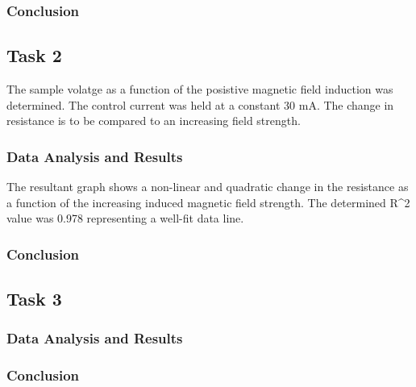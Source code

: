 \documentclass[a4paper]{article}
\begin{document}
\subsubsection{Conclusion}

\subsection{Task 2}

\qq The sample volatge as a function of the posistive magnetic field
induction was determined. The control current was held at a constant
30 mA. The change in resistance is to be compared to an increasing
field strength.

\subsubsection{Data Analysis and Results}
\qq The resultant graph shows a non-linear and quadratic change in the
resistance as a function of the increasing induced magnetic field
strength. The determined R^2 value was 0.978 representing a well-fit
data line.

\subsubsection{Conclusion}

\subsection{Task 3}

\qq 

\subsubsection{Data Analysis and Results}

\subsubsection{Conclusion}
\end{document}
